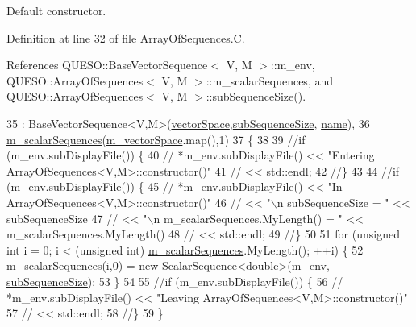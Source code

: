 Default constructor. 



Definition at line 32 of file Array\-Of\-Sequences.\-C.



References Q\-U\-E\-S\-O\-::\-Base\-Vector\-Sequence$<$ V, M $>$\-::m\-\_\-env, Q\-U\-E\-S\-O\-::\-Array\-Of\-Sequences$<$ V, M $>$\-::m\-\_\-scalar\-Sequences, and Q\-U\-E\-S\-O\-::\-Array\-Of\-Sequences$<$ V, M $>$\-::sub\-Sequence\-Size().


\begin{DoxyCode}
35     : BaseVectorSequence<V,M>(\hyperlink{class_q_u_e_s_o_1_1_base_vector_sequence_af9a4dd979a2fa8dee85bb07793b59ba2}{vectorSpace},\hyperlink{class_q_u_e_s_o_1_1_array_of_sequences_a007d00d2398007b9bac82ed23eedb1e2}{subSequenceSize},
      \hyperlink{class_q_u_e_s_o_1_1_base_vector_sequence_a48f6fe02cf77f4233d3bcdfef3870f19}{name}),
36       \hyperlink{class_q_u_e_s_o_1_1_array_of_sequences_a1f8047145ca75081c303bbbab5881119}{m\_scalarSequences}(\hyperlink{class_q_u_e_s_o_1_1_base_vector_sequence_a4bd171e39ed050ff105c808336f35198}{m\_vectorSpace}.map(),1)
37 \{
38 
39   \textcolor{comment}{//if (m\_env.subDisplayFile()) \{}
40   \textcolor{comment}{//  *m\_env.subDisplayFile() << "Entering ArrayOfSequences<V,M>::constructor()"}
41   \textcolor{comment}{//                         << std::endl;}
42   \textcolor{comment}{//\}}
43 
44   \textcolor{comment}{//if (m\_env.subDisplayFile()) \{}
45   \textcolor{comment}{//  *m\_env.subDisplayFile() << "In ArrayOfSequences<V,M>::constructor()"}
46   \textcolor{comment}{//                         << "\(\backslash\)n subSequenceSize = "              << subSequenceSize}
47   \textcolor{comment}{//                         << "\(\backslash\)n m\_scalarSequences.MyLength() = " << m\_scalarSequences.MyLength()}
48   \textcolor{comment}{//                         << std::endl;}
49   \textcolor{comment}{//\}}
50 
51   \textcolor{keywordflow}{for} (\textcolor{keywordtype}{unsigned} \textcolor{keywordtype}{int} i = 0; i < (\textcolor{keywordtype}{unsigned} int) \hyperlink{class_q_u_e_s_o_1_1_array_of_sequences_a1f8047145ca75081c303bbbab5881119}{m\_scalarSequences}.MyLength(); ++i) \{
52     \hyperlink{class_q_u_e_s_o_1_1_array_of_sequences_a1f8047145ca75081c303bbbab5881119}{m\_scalarSequences}(i,0) = \textcolor{keyword}{new} ScalarSequence<double>(\hyperlink{class_q_u_e_s_o_1_1_base_vector_sequence_a8e8824d2a63c5a43bcc6473e3a0491e8}{m\_env},
      \hyperlink{class_q_u_e_s_o_1_1_array_of_sequences_a007d00d2398007b9bac82ed23eedb1e2}{subSequenceSize});
53   \}
54 
55   \textcolor{comment}{//if (m\_env.subDisplayFile()) \{}
56   \textcolor{comment}{//  *m\_env.subDisplayFile() << "Leaving ArrayOfSequences<V,M>::constructor()"}
57   \textcolor{comment}{//                         << std::endl;}
58   \textcolor{comment}{//\}}
59 \}
\end{DoxyCode}
